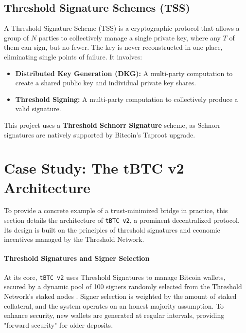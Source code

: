 \documentclass{DESSThesis}
\begin{document}
\subsection{Threshold Signature Schemes (TSS)}
\label{subsec:tss_concept}
A Threshold Signature Scheme (TSS) is a cryptographic protocol that allows a group of \(N\) parties to collectively manage a single private key, where any \(T\) of them can sign, but no fewer. The key is never reconstructed in one place, eliminating single points of failure. It involves:
\begin{itemize}
    \item \textbf{Distributed Key Generation (DKG):} A multi-party computation to create a shared public key and individual private key shares.
    \item \textbf{Threshold Signing:} A multi-party computation to collectively produce a valid signature.
\end{itemize}
This project uses a \textbf{Threshold Schnorr Signature} scheme, as Schnorr signatures are natively supported by Bitcoin's Taproot upgrade.

\section{Case Study: The tBTC v2 Architecture}
\label{sec:tbtc_v2_case_study}
To provide a concrete example of a trust-minimized bridge in practice, this section details the architecture of \texttt{tBTC v2}, a prominent decentralized protocol. Its design is built on the principles of threshold signatures and economic incentives managed by the Threshold Network.

\paragraph{Threshold Signatures and Signer Selection}
At its core, \texttt{tBTC v2} uses Threshold Signatures to manage Bitcoin wallets, secured by a dynamic pool of 100 signers randomly selected from the Threshold Network's staked nodes \cite{noauthor_tbtc_2025}. Signer selection is weighted by the amount of staked collateral, and the system operates on an honest majority assumption. To enhance security, new wallets are generated at regular intervals, providing "forward security" for older deposits.
\end{document}
